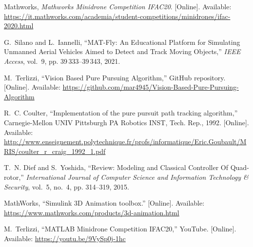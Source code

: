 \documentclass[a4paper,twocolumn,10pt]{article}
\begin{document}
\begin{thebibliography}{10}
        Mathworks, \emph{Mathworks Minidrone Competition IFAC20}. [Online].
        Available:
        \url{https://it.mathworks.com/academia/student-competitions/minidrones/ifac-2020.html}

        G.~Silano and L.~Iannelli, ``{MAT-Fly: An Educational Platform for Simulating
        Unmanned Aerial Vehicles Aimed to Detect and Track Moving Objects},''
        \emph{IEEE Access}, vol.~9, pp. 39\,333--39\,343, 2021.

        M.~{Terlizzi}, ``{Vision Based Pure Pursuing Algorithm},'' GitHub repository.
        [Online]. Available:
        \url{https://github.com/mar4945/Vision-Based-Pure-Pursuing-Algorithm}

        R.~C. {Coulter}, ``{Implementation of the pure pursuit path tracking
        algorithm},'' {Carnegie-Mellon UNIV Pittsburgh PA Robotics INST}, Tech. Rep.,
        1992. [Online]. Available:
        \url{http://www.enseignement.polytechnique.fr/profs/informatique/Eric.Goubault/MRIS/coulter_r_craig_1992_1.pdf}

        T.~N. Dief and S.~Yoshida, ``{Review: Modeling and Classical Controller Of
        Quad-rotor},'' \emph{International Journal of Computer Science and
        Information Technology \& Security}, vol.~5, no.~4, pp. 314--319, 2015.

        {MathWorks}, ``{Simulink 3D Animation toolbox}.'' [Online]. Available:
        \url{https://www.mathworks.com/products/3d-animation.html}

        M.~{Terlizzi}, ``{MATLAB Minidrone Competition IFAC20},'' YouTube. [Online].
        Available: \url{https://youtu.be/9VySp0j-1hc}
    \end{thebibliography}
\end{document}

